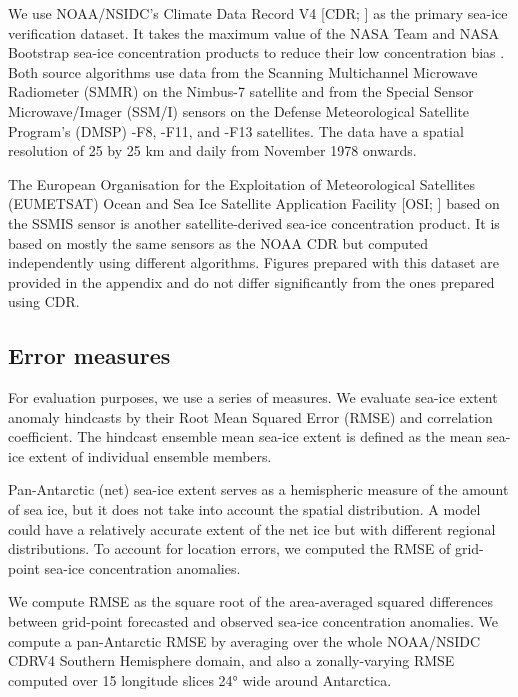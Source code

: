 \documentclass[tc, manuscript]{copernicus}
\begin{document}
We use NOAA/NSIDC's Climate Data Record V4 {[}CDR; \citet{meier2014}{]}
as the primary sea-ice verification dataset. It takes the maximum value
of the NASA Team \citep{cavalieri1984} and NASA Bootstrap
\citep{comiso2023} sea-ice concentration products to reduce their low
concentration bias \citep{meier2014, meier2021}. Both source algorithms
use data from the Scanning Multichannel Microwave Radiometer (SMMR) on
the Nimbus-7 satellite and from the Special Sensor Microwave/Imager
(SSM/I) sensors on the Defense Meteorological Satellite Program's (DMSP)
-F8, -F11, and -F13 satellites. The data have a spatial resolution of 25
by 25 km and daily from November 1978 onwards.

The European Organisation for the Exploitation of Meteorological
Satellites (EUMETSAT) Ocean and Sea Ice Satellite Application Facility
{[}OSI; \citet{OSISAF}{]} based on the SSMIS sensor is another
satellite-derived sea-ice concentration product. It is based on mostly
the same sensors as the NOAA CDR but computed independently using
different algorithms. Figures prepared with this dataset are provided in
the appendix and do not differ significantly from the ones prepared
using CDR.

\subsection{Error measures}\label{error-measures}

For evaluation purposes, we use a series of measures. We evaluate
sea-ice extent anomaly hindcasts by their Root Mean Squared Error (RMSE)
and correlation coefficient. The hindcast ensemble mean sea-ice extent
is defined as the mean sea-ice extent of individual ensemble members.

Pan-Antarctic (net) sea-ice extent serves as a hemispheric measure of
the amount of sea ice, but it does not take into account the spatial
distribution. A model could have a relatively accurate extent of the net
ice but with different regional distributions. To account for location
errors, we computed the RMSE of grid-point sea-ice concentration
anomalies.

We compute RMSE as the square root of the area-averaged squared
differences between grid-point forecasted and observed sea-ice
concentration anomalies. We compute a pan-Antarctic RMSE by averaging
over the whole NOAA/NSIDC CDRV4 Southern Hemisphere domain, and also a
zonally-varying RMSE computed over 15 longitude slices 24° wide around
Antarctica.
\end{document}
